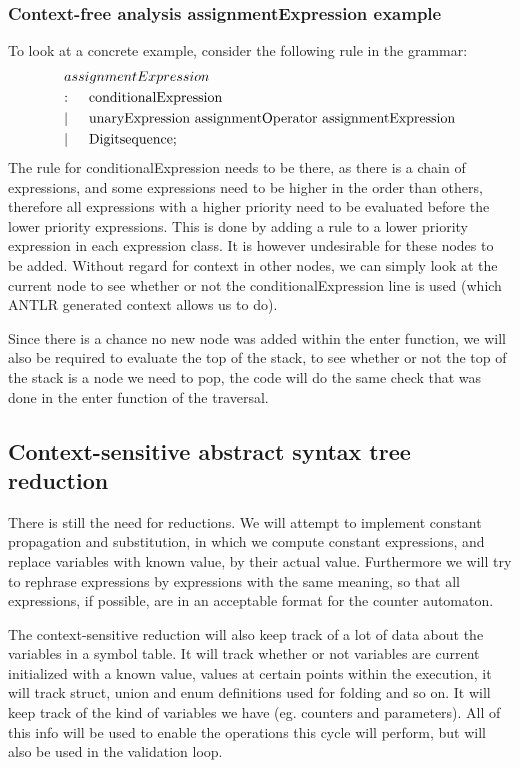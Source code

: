 \documentclass[12pt]{article}
\begin{document}
\subsubsection{Context-free analysis assignmentExpression example}
To look at a concrete example, consider the following rule in the grammar:
\begin{align*}
	&assignmentExpression\\
	&\text{:}\indent \text{conditionalExpression}\\
	&|\indent \text{unaryExpression assignmentOperator assignmentExpression}\\
	&|\indent \text{Digitsequence}; \\
\end{align*}
The rule for conditionalExpression needs to be there, as there is a chain of expressions, and some expressions need to be higher in the order than others, therefore all expressions with a higher priority need to be evaluated before the lower priority expressions. This is done by adding a rule to a lower priority expression in each expression class. It is however undesirable for these nodes to be added. Without regard for context in other nodes, we can simply look at the current node to see whether or not the conditionalExpression line is used (which ANTLR generated context allows us to do).

Since there is a chance no new node was added within the enter function, we will also be required to evaluate the top of the stack, to see whether or not the top of the stack is a node we need to pop, the code will do the same check that was done in the enter function of the traversal.

\subsection{Context-sensitive abstract syntax tree reduction}
There is still the need for 
 reductions. We will attempt to implement constant propagation and substitution, in which we compute constant expressions, and replace variables with known value, by their actual value. Furthermore we will try to rephrase expressions by expressions with the same meaning, so that all expressions, if possible, are in an acceptable format for the counter automaton.

The context-sensitive reduction will also keep track of a lot of data about the variables in a symbol table. It will track whether or not variables are current initialized with a known value, values at certain points within the execution, it will track struct, union and enum definitions used for folding and so on. It will keep track of the kind of variables we have (eg. counters and parameters). All of this info will be used to enable the operations this cycle will perform, but will also be used in the validation loop.
\end{document}
